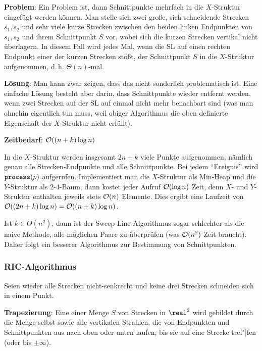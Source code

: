 \linie

\textbf{Problem}:
Ein Problem ist, dann Schnittpunkte mehrfach in die $X$-Struktur eingefügt werden können.
Man stelle sich zwei große, sich schneidende Strecken $s_1, s_2$
und sehr viele kurze Strecken zwischen den beiden linken Endpunkten von $s_1, s_2$ und
ihrem Schnittpunkt $S$ vor, wobei sich die kurzen Strecken vertikal nicht überlagern.
In diesem Fall wird jedes Mal, wenn die SL auf einen rechten Endpunkt einer der kurzen Strecken
stößt, der Schnittpunkt $S$ in die $X$-Struktur aufgenommen, d.\,h. $\Theta(n)$-mal.

\textbf{Lösung}:
Man kann zwar zeigen, dass das nicht sonderlich problematisch ist.
Eine einfache Lösung besteht aber darin, dass Schnittpunkte wieder entfernt werden,
wenn zwei Strecken auf der SL auf einmal nicht mehr benachbart sind
(was man ohnehin eigentlich tun muss, weil obiger Algorithmus die
oben definierte Eigenschaft der $X$-Struktur nicht erfüllt).

\linie

\textbf{Zeitbedarf}:
$\mathcal{O}((n + k) \log n)$

\begin{Beweis}
    In die $X$-Struktur werden insgesamt $2n + k$ viele Punkte aufgenommen, nämlich genau alle
    Strecken-Endpunkte und alle Schnittpunkte.
    Bei jedem "`Ereignis"' wird $\texttt{process}(p)$ aufgerufen.
    Implementiert man die $X$-Struktur als Min-Heap und die $Y$-Struktur als 2-4-Baum,
    dann kostet jeder Aufruf $\mathcal{O}(\log n)$ Zeit,
    denn $X$- und $Y$-Struktur enthalten jeweils stets $\mathcal{O}(n)$ Elemente.
    Dies ergibt eine Laufzeit von $\mathcal{O}((2n + k) \log n) = \mathcal{O}((n + k) \log n)$.
\end{Beweis}

Ist $k \in \Theta(n^2)$, dann ist der Sweep-Line-Algorithmus sogar schlechter als die naive
Methode, alle möglichen Paare zu überprüfen (was $\mathcal{O}(n^2)$ Zeit braucht).
Daher folgt ein besserer Algorithmus zur Bestimmung von Schnittpunkten.

\pagebreak

\subsubsection{%
    RIC-Algorithmus%
}

Seien wieder alle Strecken nicht-senkrecht und keine drei Strecken schneiden sich in einem Punkt.

\textbf{Trapezierung}:
Eine  einer Menge $S$ von Strecken in $\real^2$ wird gebildet durch die Menge
selbst sowie alle vertikalen Strahlen, die von Endpunkten und Schnittpunkten aus nach oben oder
unten laufen, bis sie auf eine Strecke tref"|fen (oder bis $\pm\infty$).

